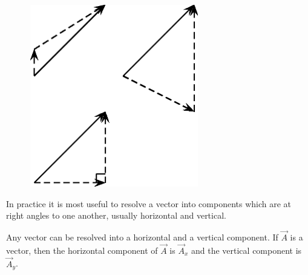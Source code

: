    \setcounter{subfigure}{0}


	\begin{figure}[H] %
    \begin{center}
    \label{m38819*id192894!!!underscore!!!media}\label{m38819*id192894!!!underscore!!!printimage}\includegraphics[height=300px]{col11305.imgs/m38819_PG11C1_058.png} %
        
      \vspace{2pt}
    \vspace{.1in}
    
    \end{center}

 \end{figure}   

    \addtocounter{footnote}{-0}
    
      \par 
      \label{m38819*id192901}In practice it is most useful to resolve a vector into components
which are at right angles to one another, usually horizontal and vertical.\par 
      \label{m38819*id192905}Any vector can be resolved into a horizontal and a vertical component. If \begin{math}\stackrel{\to }{A}\end{math} is a vector, then the horizontal component of \begin{math}\stackrel{\to }{A}\end{math} is \begin{math}{\stackrel{\to }{A}}_{x}\end{math} and the vertical component is \begin{math}{\stackrel{\to }{A}}_{y}\end{math}.\par 
      \label{m38819*id192983}
        
